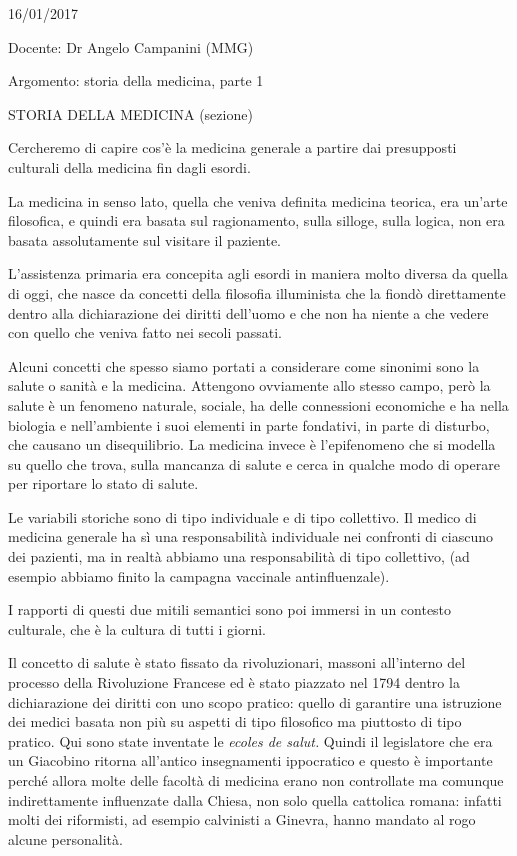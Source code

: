 \documentclass[]{article}
\date{}
\begin{document}
16/01/2017

Docente: Dr Angelo Campanini (MMG)

Argomento: storia della medicina, parte 1

STORIA DELLA MEDICINA (sezione)

Cercheremo di capire cos'è la medicina generale a partire dai
presupposti culturali della medicina fin dagli esordi.

La medicina in senso lato, quella che veniva definita medicina teorica,
era un'arte filosofica, e quindi era basata sul ragionamento, sulla
silloge, sulla logica, non era basata assolutamente sul visitare il
paziente.

L'assistenza primaria era concepita agli esordi in maniera molto diversa
da quella di oggi, che nasce da concetti della filosofia illuminista che
la fiondò direttamente dentro alla dichiarazione dei diritti dell'uomo e
che non ha niente a che vedere con quello che veniva fatto nei secoli
passati.

Alcuni concetti che spesso siamo portati a considerare come sinonimi
sono la salute o sanità e la medicina. Attengono ovviamente allo stesso
campo, però la salute è un fenomeno naturale, sociale, ha delle
connessioni economiche e ha nella biologia e nell'ambiente i suoi
elementi in parte fondativi, in parte di disturbo, che causano un
disequilibrio. La medicina invece è l'epifenomeno che si modella su
quello che trova, sulla mancanza di salute e cerca in qualche modo di
operare per riportare lo stato di salute.

Le variabili storiche sono di tipo individuale e di tipo collettivo. Il
medico di medicina generale ha sì una responsabilità individuale nei
confronti di ciascuno dei pazienti, ma in realtà abbiamo una
responsabilità di tipo collettivo, (ad esempio abbiamo finito la
campagna vaccinale antinfluenzale).

I rapporti di questi due mitili semantici sono poi immersi in un
contesto culturale, che è la cultura di tutti i giorni.

Il concetto di salute è stato fissato da rivoluzionari, massoni
all'interno del processo della Rivoluzione Francese ed è stato piazzato
nel 1794 dentro la dichiarazione dei diritti con uno scopo pratico:
quello di garantire una istruzione dei medici basata non più su aspetti
di tipo filosofico ma piuttosto di tipo pratico. Qui sono state
inventate le \emph{ecoles de salut.} Quindi il legislatore che era un
Giacobino ritorna all'antico insegnamenti ippocratico e questo è
importante perché allora molte delle facoltà di medicina erano non
controllate ma comunque indirettamente influenzate dalla Chiesa, non
solo quella cattolica romana: infatti molti dei riformisti, ad esempio
calvinisti a Ginevra, hanno mandato al rogo alcune personalità.
\end{document}
